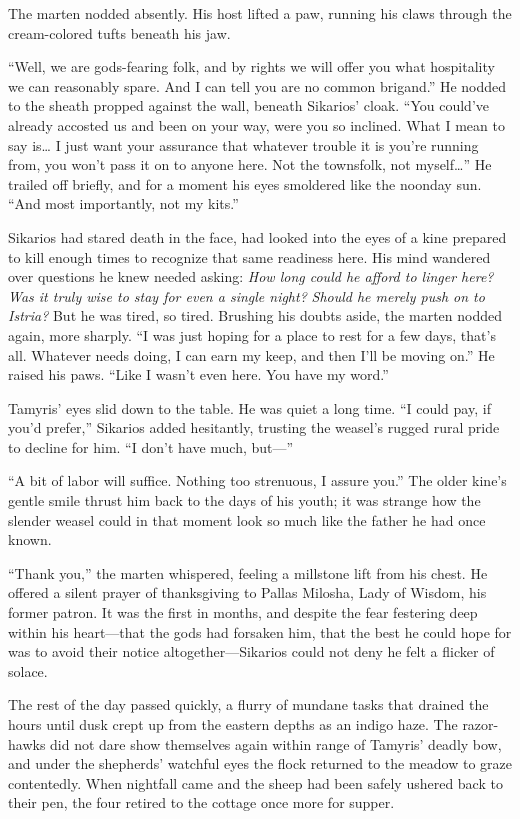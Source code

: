 The marten nodded absently. His host lifted a paw, running his claws through the cream-colored tufts beneath his jaw.

``Well, we are gods-fearing folk, and by rights we will offer you what hospitality we can reasonably spare. And I can tell you are no common brigand.'' He nodded to the sheath propped against the wall, beneath Sikarios' cloak. ``You could've already accosted us and been on your way, were you so inclined. What I mean to say is\ldots{} I just want your assurance that whatever trouble it is you're running from, you won't pass it on to anyone here. Not the townsfolk, not myself\ldots'' He trailed off briefly, and for a moment his eyes smoldered like the noonday sun. ``And most importantly, not my kits.''

Sikarios had stared death in the face, had looked into the eyes of a kine prepared to kill enough times to recognize that same readiness here. His mind wandered over questions he knew needed asking: \emph{How long could he afford to linger here? Was it truly wise to stay for even a single night?} \emph{Should he merely push on to Istria?} But he was tired, so tired. Brushing his doubts aside, the marten nodded again, more sharply. ``I was just hoping for a place to rest for a few days, that's all. Whatever needs doing, I can earn my keep, and then I'll be moving on.'' He raised his paws. ``Like I wasn't even here. You have my word.''

Tamyris' eyes slid down to the table. He was quiet a long time. ``I could pay, if you'd prefer,'' Sikarios added hesitantly, trusting the weasel's rugged rural pride to decline for him. ``I don't have much, but---''

``A bit of labor will suffice. Nothing too strenuous, I assure you.'' The older kine's gentle smile thrust him back to the days of his youth; it was strange how the slender weasel could in that moment look so much like the father he had once known.

``Thank you,'' the marten whispered, feeling a millstone lift from his chest. He offered a silent prayer of thanksgiving to Pallas Milosha, Lady of Wisdom, his former patron. It was the first in months, and despite the fear festering deep within his heart---that the gods had forsaken him, that the best he could hope for was to avoid their notice altogether---Sikarios could not deny he felt a flicker of solace.

\secdiv

The rest of the day passed quickly, a flurry of mundane tasks that drained the hours until dusk crept up from the eastern depths as an indigo haze. The razor-hawks did not dare show themselves again within range of Tamyris' deadly bow, and under the shepherds' watchful eyes the flock returned to the meadow to graze contentedly. When nightfall came and the sheep had been safely ushered back to their pen, the four retired to the cottage once more for supper.

